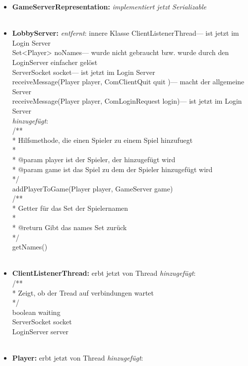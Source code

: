 \documentclass{article}
\begin{document}
\begin{itemize}
\\
\item  \textbf{GameServerRepresentation:} \textit{implementiert jetzt Serializable}\\
\\
\item  \textbf{LobbyServer:} \textit{entfernt}: 
innere Klasse ClientListenerThread--- ist jetzt im Login Server\\
Set<Player> noNames--- wurde nicht gebraucht bzw. wurde durch den LoginServer einfacher gelöst\\
 ServerSocket socket--- ist jetzt im Login Server\\
receiveMessage(Player player, ComClientQuit quit )--- macht der allgemeine Server\\
receiveMessage(Player player, ComLoginRequest login)--- ist jetzt im Login Server\\
\textit{hinzugefügt}:\\
/**\\
 * Hilfsmethode, die einen Spieler zu einem Spiel hinzufuegt\\
 * \\
 * @param player ist der Spieler, der hinzugefügt wird\\
 * @param game ist das Spiel zu dem der Spieler hinzugefügt wird\\
 */\\
 addPlayerToGame(Player player, GameServer game)\\
/**\\
 * Getter für das Set der Spielernamen\\
 * \\
 * @return Gibt das names Set zurück\\
 */\\
getNames()\\
\\
\item  \textbf{ClientListenerThread:} erbt jetzt von Thread  \textit{hinzugefügt}:\\
/**\\
 * Zeigt, ob der Tread auf verbindungen wartet\\
 */\\
boolean waiting\\
ServerSocket socket\\
LoginServer server\\
\\
\item  \textbf{Player:}  erbt jetzt von Thread  \textit{hinzugefügt}: \\

\end{itemize}
\end{document}
